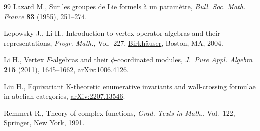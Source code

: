 \documentclass[10pt,a4paper]{amsart}
\numberwithin{equation}{section}
\theoremstyle{definition}
\begin{document}
\begin{thebibliography}{99}
Lazard M., Sur les groupes de {L}ie formels \`a un param\`etre,
 \href{https://doi.org/10.24033/bsmf.1462}{\textit{Bull. Soc. Math. France}}
 \textbf{83} (1955), 251--274.

Lepowsky J., Li H., Introduction to vertex operator algebras and their
 representations, \textit{Progr. Math.}, Vol.~227,
 \href{https://doi.org/10.1007/978-0-8176-8186-9}{Birkh\"auser}, Boston, MA,
 2004.

Li H., Vertex {$F$}-algebras and their {$\phi$}-coordinated modules,
 \href{https://doi.org/10.1016/j.jpaa.2010.10.001}{\textit{J.~Pure Appl.
 Algebra}} \textbf{215} (2011), 1645--1662,
 \href{http://arxiv.org/abs/1006.4126}{arXiv:1006.4126}.

Liu H., Equivariant {K}-theoretic enumerative invariants and wall-crossing
 formulae in abelian categories,
 \href{http://arxiv.org/abs/2207.13546}{arXiv:2207.13546}.

Remmert R., Theory of complex functions, \textit{Grad. Texts in Math.}, Vol.~122, \href{https://doi.org/10.1007/978-1-4612-0939-3}{Springer}, New York, 1991.

\end{thebibliography}
\end{document}
